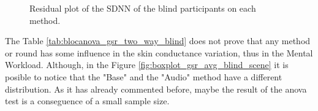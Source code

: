 \begin{figure}[!htb]
\begin{minipage}{0.45\textwidth}
        \caption{Residual plot of the SDNN of the blind participants on each method.}
        \label{fig:residplot_gsr_two_way_blind}
    \end{minipage}
\end{figure}

%

The Table \ref{tab:blocanova_gsr_two_way_blind} does not prove that any method or round has some influence in the skin conductance variation, thus in the Mental Workload. Although, in the Figure \ref{fig:boxplot_gsr_avg_blind_scene} it is posible to notice that the "Base" and the "Audio" method have a different distribution. As it has already commented before, maybe the result of the anova test is a conseguence of a small sample size.

\FloatBarrier

